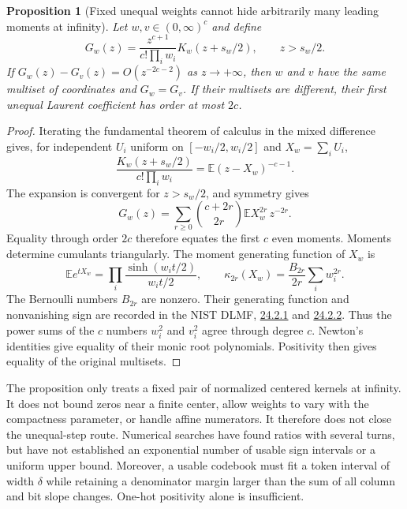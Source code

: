 \documentclass[11pt]{article}
\newtheorem{proposition}{Proposition}
\begin{document}
\begin{proposition}[Fixed unequal weights cannot hide arbitrarily many
leading moments at infinity]
Let $w,v\in(0,\infty)^c$ and define
\[
 G_w(z)=\frac{z^{c+1}}{c!\prod_iw_i}K_w(z+s_w/2),
 \qquad z>s_w/2.
\]
If $G_w(z)-G_v(z)=O(z^{-2c-2})$ as $z\to+\infty$, then $w$ and $v$
have the same multiset of coordinates and $G_w=G_v$. If their multisets
are different, their first unequal Laurent coefficient has order at most
$2c$.
\end{proposition}

\begin{proof}
Iterating the fundamental theorem of calculus in the mixed difference
gives, for independent $U_i$ uniform on $[-w_i/2,w_i/2]$ and
$X_w=\sum_iU_i$,
\[
 \frac{K_w(z+s_w/2)}{c!\prod_iw_i}
   =\mathbb E(z-X_w)^{-c-1}.
\]
The expansion is convergent for $z>s_w/2$, and symmetry gives
\[
 G_w(z)=\sum_{r\geq0}\binom{c+2r}{2r}
              \mathbb E X_w^{2r}\,z^{-2r}.
\]
Equality through order $2c$ therefore equates the first $c$ even moments.
Moments determine cumulants triangularly. The moment generating function
of $X_w$ is
\[
 \mathbb E e^{tX_w}=\prod_i\frac{\sinh(w_it/2)}{w_it/2},
 \qquad
 \kappa_{2r}(X_w)=\frac{B_{2r}}{2r}\sum_iw_i^{2r}.
\]
The Bernoulli numbers $B_{2r}$ are nonzero. Their generating function and
nonvanishing sign are recorded in the NIST DLMF,
\href{https://dlmf.nist.gov/24.2.E1}{24.2.1} and
\href{https://dlmf.nist.gov/24.2.E2}{24.2.2}.
Thus the power sums of the $c$ numbers $w_i^2$ and $v_i^2$ agree through
degree $c$. Newton's identities give equality of their monic root
polynomials. Positivity then gives equality of the original multisets.
\end{proof}

The proposition only treats a fixed pair of normalized centered kernels
at infinity. It does not bound zeros near a finite center, allow weights
to vary with the compactness parameter, or handle affine numerators.
It therefore does not close the unequal-step route. Numerical searches
have found ratios with several turns, but have not established an
exponential number of usable sign intervals or a uniform upper bound.
Moreover, a usable codebook must fit a token interval of width $\delta$
while retaining a denominator margin larger than the sum of all column
and bit slope changes. One-hot positivity alone is insufficient.
\end{document}
